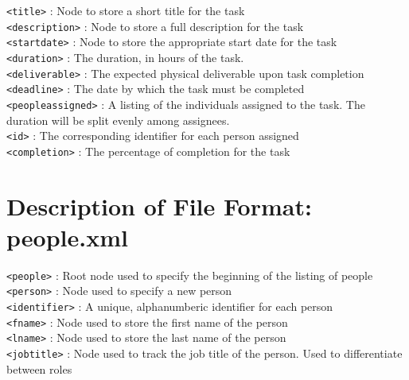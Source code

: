 \documentclass[12pt]{article}
\begin{document}
\texttt{<title>} : Node to store a short title for the task \\

\texttt{<description>} : Node to store a full description for the task \\

\texttt{<startdate>} : Node to store the appropriate start date for the task \\

\texttt{<duration>} : The duration, in hours of the task. \\

\texttt{<deliverable>} : The expected physical deliverable upon task completion \\

\texttt{<deadline>} : The date by which the task must be completed \\

\texttt{<peopleassigned>} : A listing of the individuals assigned to the task.
The duration will be split evenly among assignees. \\

\texttt{<id>} : The corresponding identifier for each person assigned \\

\texttt{<completion>} : The percentage of completion for the task \\

\pagebreak

\section{Description of File Format: people.xml}

\texttt{<people>} : Root node used to specify the beginning of the listing of people \\

\texttt{<person>} : Node used to specify a new person \\

\texttt{<identifier>} : A unique, alphanumberic identifier for each person \\

\texttt{<fname>} : Node used to store the first name of the person \\

\texttt{<lname>} : Node used to store the last name of the person \\

\texttt{<jobtitle>} : Node used to track the job title of the person.
Used to differentiate between roles \\
\end{document}
